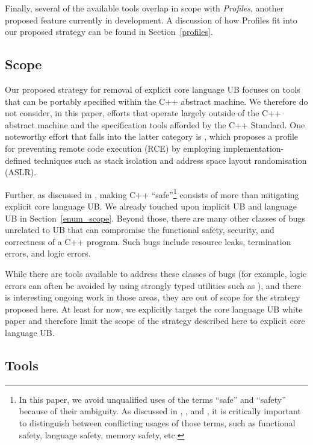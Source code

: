 Finally, several of the available tools overlap in scope with \emph{Profiles}, another proposed feature currently in development. A discussion of how Profiles fit into our proposed strategy can be found in Section~\ref{profiles}.

\subsection{Scope}

Our proposed strategy for removal of explicit core language UB focuses on tools that can be portably specified within the C++ abstract machine. We therefore do not consider, in this paper, efforts that operate largely outside of the C++ abstract machine and the specification tools afforded by the C++ Standard. One noteworthy effort that falls into the latter category is  \cite{P3627R0}, which proposes a profile for preventing remote code execution (RCE) by employing implementation-defined techniques such as stack isolation and address space layout randomisation (ASLR).

Further, as discussed in \cite{P3700R0}, making C++ ``safe''\footnote{In this paper, we avoid unqualified uses of the terms ``safe'' and ``safety'' because of their ambiguity. As discussed in \cite{P3376R0}, \cite{P3500R1}, and \cite{P3578R0}, it is critically important to distinguish between conflicting usages of those terms, such as functional safety, language safety, memory safety, etc.} consists of more than mitigating explicit core language UB. We already touched upon implicit UB and language UB in Section~\ref{enum_scope}. Beyond those, there are many other classes of bugs unrelated to UB that can compromise the functional safety, security, and correctness of a C++ program. Such bugs include resource leaks, termination errors, and logic errors. 

While there are tools available to address these classes of bugs (for example, logic errors can often be avoided by using strongly typed utilities such as \cite{P3045R6}), and there is interesting ongoing work in those areas, they are out of scope for the strategy proposed here. At least for now, we explicitly target the core language UB white paper \cite{P3656R1} and therefore limit the scope of the strategy described here to explicit core language UB. 

\subsection{Tools}
\label{tools}

